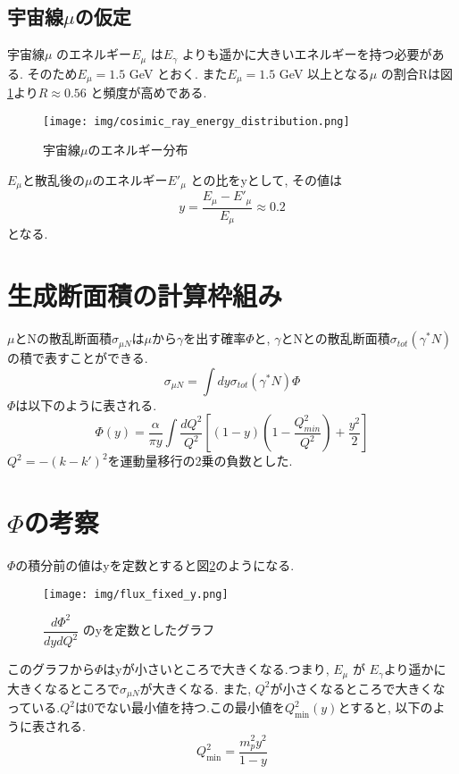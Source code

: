 \subsection{宇宙線$\mu$の仮定}
宇宙線$\mu$ のエネルギー$E_\mu$ は$E_\gamma$ よりも遥かに大きいエネルギーを持つ必要がある.
そのため$E_\mu = 1.5$ GeV とおく.
また$E_\mu = 1.5$ GeV 以上となる$\mu$ の割合Rは図\ref{fig:sigma2}より$R \approx 0.56$ と頻度が高めである.
\begin{figure}[H]
    \centering
    \texttt{[image: img/cosimic\_ray\_energy\_distribution.png]}
    \caption{宇宙線$\mu$のエネルギー分布 \cite{cosmic_ray}}
    \label{fig:sigma2}
\end{figure}
$E_\mu$と散乱後の$\mu$のエネルギー$E'_\mu$ との比をyとして, その値は
\begin{equation}
    y = \dfrac{E_\mu - E'_\mu}{E_\mu} \approx 0.2
\end{equation}
となる.

\section{生成断面積の計算枠組み}
$\mu$とNの散乱断面積$\sigma_{\mu N}$は$\mu$から$\gamma$を出す確率$\Phi$と,
$\gamma$とNとの散乱断面積$\sigma_{tot}(\gamma^* N)$の積で表すことができる.  \cite{1994nbr, BUDNEV1975181}
\begin{equation}
    \sigma_{\mu N} =\int dy  \sigma_{tot}(\gamma^* N) \Phi
\end{equation}
$\Phi$は以下のように表される.
\begin{equation}
    \Phi(y) = \dfrac{\alpha}{\pi y} \int \dfrac{dQ^2}{Q^2} [(1-y)(1 - \dfrac{Q^2_{min}}{Q^2}) + \dfrac{y^2}{2}]
\end{equation}
$Q^2 = - (k - k')^2 $を運動量移行の2乗の負数とした.

\section{\texorpdfstring{$\Phi$}{LG}の考察}\label{section2_3}
$\Phi$の積分前の値はyを定数とすると図\ref{fig:sigma3}のようになる.
\begin{figure}[H]
    \centering
    \texttt{[image: img/flux\_fixed\_y.png]}
    \caption{$\dfrac{d\Phi ^2}{dydQ^2}$ のyを定数としたグラフ}
    \label{fig:sigma3}
\end{figure}
このグラフから$\Phi$はyが小さいところで大きくなる.つまり, $E_\mu$ が $E_\gamma$より遥かに大きくなるところで$\sigma_{\mu N}$が大きくなる.
また, $Q^2$が小さくなるところで大きくなっている.$Q^2$は0でない最小値を持つ.この最小値を$Q^2_{\mathrm{min}}(y)$とすると, 以下のように表される.
\begin{equation}
    \label{eq2_8}
    Q^2_{\mathrm{min}} = \dfrac{m_p^2 y^2}{1-y}
\end{equation}

